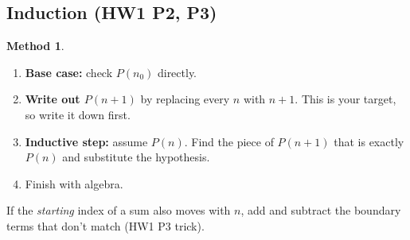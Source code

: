 \documentclass[11pt]{article}
\theoremstyle{definition}
\newtheorem{method}[defn]{Method}
\begin{document}
\subsection{Induction (HW1 P2, P3)}
\begin{method}
\begin{enumerate}[nosep]
  \item \textbf{Base case:} check $P(n_0)$ directly.
  \item \textbf{Write out $P(n+1)$} by replacing every $n$ with $n+1$.
        This is your target, so write it down first.
  \item \textbf{Inductive step:} assume $P(n)$. Find the piece of
        $P(n+1)$ that is exactly $P(n)$ and substitute the hypothesis.
  \item Finish with algebra.
\end{enumerate}
If the \emph{starting} index of a sum also moves with $n$, add and
subtract the boundary terms that don't match (HW1 P3 trick).
\end{method}
\end{document}

